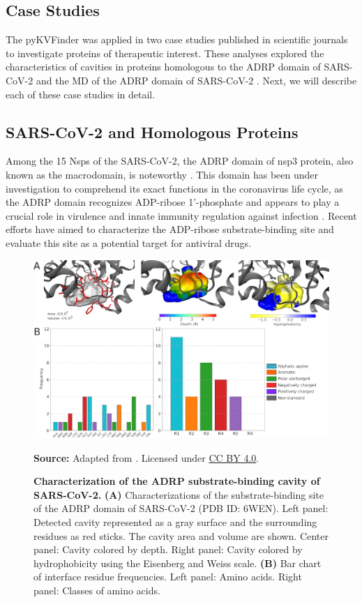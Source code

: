 \documentclass[Ingles]{phdthesis}
\begin{document}
\subsection{Case Studies}

The pyKVFinder was applied in two case studies published in scientific journals to investigate proteins of therapeutic interest. These analyses explored the characteristics of cavities in proteins homologous to the \ac{ADRP} domain of \ac{SARS-CoV-2} and the \acs{MD} of the \acs{ADRP} domain of \acs{SARS-CoV-2} \cite{guerra2021}. Next, we will describe each of these case studies in detail.

\subsection{SARS-CoV-2 and Homologous Proteins}

Among the 15 \ac{Nsps} of the \acs{SARS-CoV-2}, the \acs{ADRP} domain of nsp3 protein, also known as the macrodomain, is noteworthy \cite{michalska2020}. This domain has been under investigation to comprehend its exact functions in the coronavirus life cycle, as the \acs{ADRP} domain recognizes ADP-ribose 1'-phosphate and appears to play a crucial role in virulence and innate immunity regulation against infection \cite{fehr2016,claverie2020}. Recent efforts have aimed to characterize the ADP-ribose substrate-binding site and evaluate this site as a potential target for antiviral drugs.

\begin{figure}[h]
  \centering
  \includegraphics[scale=0.9]{images/adrp-sars-cov-2-analysis.png}
  \centerline{\tiny{\textbf{Source:} Adapted from \cite{guerra2021}. Licensed under \href{https://creativecommons.org/licenses/by/4.0/}{CC BY 4.0}.}}
  \caption[Characterization of the ADRP substrate-binding cavity of SARS-CoV-2]{\textbf{Characterization of the ADRP substrate-binding cavity of SARS-CoV-2.} \textbf{(A)} Characterizations of the substrate-binding site of the ADRP domain of SARS-CoV-2 (PDB ID: 6WEN). Left panel: Detected cavity represented as a gray surface and the surrounding residues as red sticks. The cavity area and volume are shown. Center panel: Cavity colored by depth. Right panel: Cavity colored by hydrophobicity using the Eisenberg and Weiss scale. \textbf{(B)} Bar chart of interface residue frequencies. Left panel: Amino acids. Right panel: Classes of amino acids.}
  \label{fig:binding-site-analysis}
\end{figure}
\end{document}
